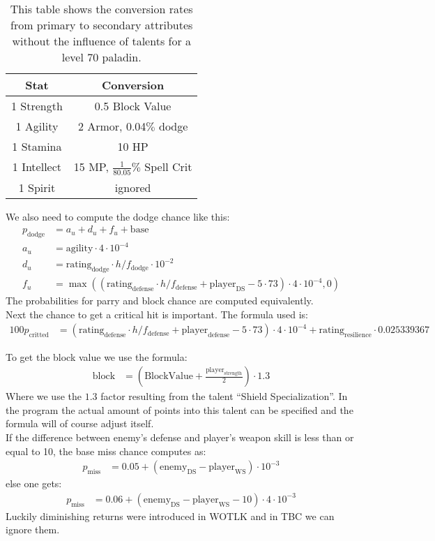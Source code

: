 \documentclass[a4paper,10pt]{article}
\begin{document}
\begin{table}
 \centering 
 \begin{tabular}{c|c}
  Stat&Conversion\\
  \hline 
  1 Strength&0.5 Block Value\\
  1 Agility&2 Armor, 0.04$\%$ dodge\\
  1 Stamina&10 HP\\
  1 Intellect& 15 MP, $\frac{1}{80.05}\%$ Spell Crit\\
  1 Spirit&ignored\\
 \end{tabular}
\caption{This table shows the conversion rates from primary to secondary attributes without the influence of talents for a level 70 paladin.}
\label{tab_conversion}
\end{table}


We also need to compute the dodge chance like this:
\begin{align*}
 p_\mathrm{dodge}&=a_u+d_u+f_u+\mathrm{base}\\
 a_u&=\mathrm{agility}\cdot 4\cdot 10^{-4}\\
 d_u&=\mathrm{rating}_\mathrm{dodge}\cdot h/f_\mathrm{dodge}\cdot 10^{-2}\\
 f_u&=\max((\mathrm{rating}_\mathrm{defense}\cdot h/f_\mathrm{defense}+\mathrm{player}_\mathrm{DS}-5\cdot73)\cdot 4\cdot 10^{-4},0)
\end{align*}
The probabilities for parry and block chance are computed equivalently.\\
Next the chance to get a critical hit is important. The formula used is:
\begin{align*}
 100p_\mathrm{critted}&=(\mathrm{rating}_\mathrm{defense}\cdot h/f_\mathrm{defense}+\mathrm{player}_\mathrm{defense}-5\cdot73)\cdot 4\cdot10^{-4}+\mathrm{rating}_\mathrm{resilience}\cdot0.025339367
\end{align*}

To get the block value we use the formula:
\begin{align*}
 \mathrm{block}&=\left(\mathrm{BlockValue}+\frac{\mathrm{player}_\mathrm{strength}}{2}\right)\cdot 1.3
\end{align*}
Where we use the $1.3$ factor resulting from the talent ``Shield Specialization''. In the program the actual amount of points into this talent can be specified and the formula will of course adjust itself.\\
If the difference between enemy's defense and player's weapon skill is less than or equal to 10, the base miss chance computes as:
\begin{align*}
 p_\mathrm{miss}&=0.05+(\mathrm{enemy}_\mathrm{DS}-\mathrm{player}_\mathrm{WS})\cdot10^{-3}
\end{align*}
else one gets:
\begin{align*}
 p_\mathrm{miss}&=0.06+(\mathrm{enemy}_\mathrm{DS}-\mathrm{player}_\mathrm{WS}-10)\cdot4\cdot10^{-3}
\end{align*}
Luckily diminishing returns were introduced in WOTLK and in TBC we can ignore them. 
\end{document}

